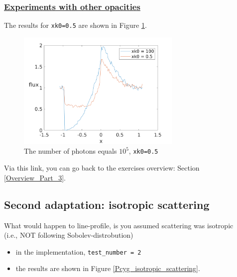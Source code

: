 \documentclass[../main/main.tex]{subfiles}
\begin{document}
\noindent{}
  
\newpage
\subsubsection{\underline{Experiments with other opacities}}
The results for \texttt{xk0=0.5} are shown in Figure \ref{PCyg_mu_eq_xk0_05_vs_100}.


\begin{figure}[!htbp]
\centering
\includegraphics[width=0.7\textwidth]{../../introductory_exercises/P_Cygni_profile_UV_resonance/data/npot5xk0100alpha0beta1test0.png}
\caption{The number of photons equals $10^{5}$, \texttt{xk0=0.5}}
\label{PCyg_mu_eq_xk0_05_vs_100}
\end{figure}

Via this link, you can go back to the exercises overview: Section \underline{\ref{Overview_Part_3}}.


\newpage
\subsection{Second adaptation: isotropic scattering}
\label{isotropic_scattering}
What would happen to line-profile, is you assumed scattering
was isotropic 
\\(i.e., NOT following Sobolev-distrobution)

\begin{itemize}
\item in the implementation, \texttt{test\_number = 2}
\item the results are shown in Figure \ref{Pcyg_isotropic_scattering}.
\end{itemize}
\end{document}
